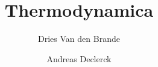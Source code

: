 \usepackage[dutch]{babel}
\usepackage{amsmath}

\title{Thermodynamica}
\author{Dries Van den Brande \and Andreas Declerck}
